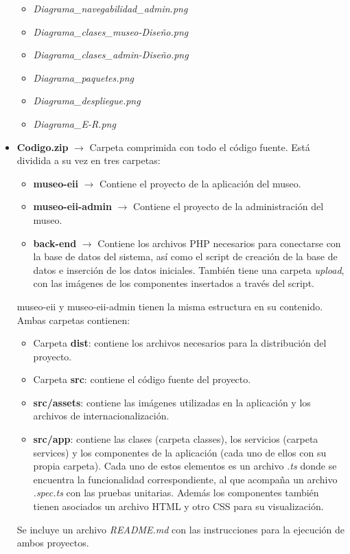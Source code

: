 \begin{itemize}
\begin{itemize}
		\item \textit{Diagrama\_navegabilidad\_admin.png}
		\item \textit{Diagrama\_clases\_museo-Diseño.png}
		\item \textit{Diagrama\_clases\_admin-Diseño.png}
		\item \textit{Diagrama\_paquetes.png}
		\item \textit{Diagrama\_despliegue.png}
		\item \textit{Diagrama\_E-R.png}
	\end{itemize}
	\item \textbf{Codigo.zip} \(\rightarrow\) Carpeta comprimida con todo el código fuente. Está dividida a su vez en tres carpetas:
	\begin{itemize}
		\item \textbf{museo-eii} \(\rightarrow\) Contiene el proyecto de la aplicación del museo.
		\item \textbf{museo-eii-admin} \(\rightarrow\) Contiene el proyecto de la administración del museo.
		\item \textbf{back-end} \(\rightarrow\) Contiene los archivos PHP necesarios para conectarse con la base de datos del sistema, así como el script de creación de la base de datos e inserción de los datos iniciales. También tiene una carpeta \textit{upload}, con las imágenes de los componentes insertados a través del script.
	\end{itemize}
	museo-eii y museo-eii-admin tienen la misma estructura en su contenido. Ambas carpetas contienen:
	\begin{itemize}
		\item Carpeta \textbf{dist}: contiene los archivos necesarios para la distribución del proyecto.
		\item Carpeta \textbf{src}: contiene el código fuente del proyecto.
		\item \textbf{src/assets}: contiene las imágenes utilizadas en la aplicación y los archivos de internacionalización.
		\item \textbf{src/app}: contiene las clases (carpeta classes), los servicios (carpeta services) y los componentes de la aplicación (cada uno de ellos con su propia carpeta). Cada uno de estos elementos es un archivo \textit{.ts} donde se encuentra la funcionalidad correspondiente, al que acompaña un archivo \textit{.spec.ts} con las pruebas unitarias. Además los componentes también tienen asociados un archivo HTML y otro CSS para su visualización.
	\end{itemize} 
\par Se incluye un archivo \textit{README.md} con las instrucciones para la ejecución de ambos proyectos.
\end{itemize}
